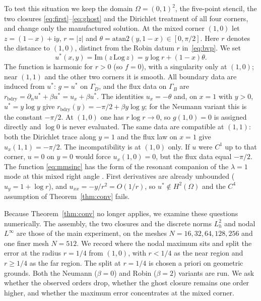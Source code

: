 \documentclass[11pt,a4paper]{article}
\theoremstyle{palplain}
\theoremstyle{paldef}
\theoremstyle{palremark}
\newcommand{\GD}{\Gamma_D}
\newcommand{\GB}{\Gamma_B}
\begin{document}
To test this situation we keep the domain $\Omega=(0,1)^2$, the five-point stencil, the two
closures \eqref{eq:first}--\eqref{eq:ghost} and the Dirichlet treatment of all four corners, and
change only the manufactured solution. At the mixed corner $(1,0)$ let
$z=(1-x)+\mathrm{i}y$, $r=|z|$ and $\theta=\mathrm{atan2}(y,1-x)\in[0,\pi/2]$. Here $r$ denotes the
distance to $(1,0)$, distinct from the Robin datum $r$ in~\eqref{eq:bvp}. We set
\begin{equation}\label{eq:mmsinc}
u^*(x,y)=\mathrm{Im}(z\,\mathrm{Log}\,z)=y\log r+(1-x)\theta.
\end{equation}
The function is harmonic for $r>0$ (so $f=0$), with a singularity only at $(1,0)$; near
$(1,1)$ and the other two corners it is smooth. All boundary data are induced from $u^*$:
$g=u^*$ on $\GD$, and the flux data on $\GB$ are
$r_{\mathrm{bdry}}=\partial_n u^*+\beta u^*=u_x+\beta u^*$. The identities $u_x=-\theta$ and,
on $x=1$ with $y>0$, $u^*=y\log y$ give $r_{\mathrm{bdry}}(y)=-\pi/2+\beta y\log y$; for the
Neumann variant this is the constant $-\pi/2$. At $(1,0)$ one has $r\log r\to0$, so
$g(1,0)=0$ is assigned directly and $\log 0$ is never evaluated. The same data are compatible
at $(1,1)$: both the Dirichlet trace along $y=1$ and the flux law on $x=1$ give
$u_x(1,1)=-\pi/2$. The incompatibility is at $(1,0)$ only. If $u$ were $C^1$ up to that
corner, $u=0$ on $y=0$ would force $u_x(1,0)=0$, but the flux data equal $-\pi/2$. The
function \eqref{eq:mmsinc} has the form of the resonant companion of the
$\lambda=1$ mode at this mixed right angle \cite{grisvard}. First derivatives are already
unbounded ($u_y=1+\log r$), and $u_{xx}=-y/r^2=O(1/r)$, so $u^*\notin H^2(\Omega)$ and the
$C^4$ assumption of Theorem~\ref{thm:conv} fails.

Because Theorem~\ref{thm:conv} no longer applies, we examine these questions numerically. The
assembly, the two closures and the discrete norms $L^2_h$ and nodal $L^\infty$ are those of
the main experiment, on the meshes $N=16,32,64,128,256$ and one finer mesh $N=512$. We record
where the nodal maximum sits and split the error at the radius $r=1/4$ from $(1,0)$, with
$r<1/4$ as the near region and $r\ge 1/4$ as the far region. The split at $r=1/4$ is chosen a
priori on geometric grounds. Both the Neumann ($\beta=0$) and Robin
($\beta=2$) variants are run. We ask whether the observed orders drop, whether the ghost
closure remains one order higher, and whether the maximum error concentrates at the mixed
corner.
\end{document}
